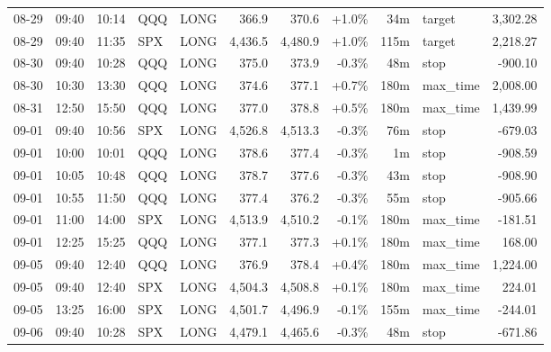 \documentclass[11pt,a4paper,twoside]{article}
\begin{document}
\begin{center}
\begin{longtable}{>{\color{txtmain}}l l l l l r r r r >{\color{txtmain}}l r}
08-29 & 09:40 & 10:14 & QQQ & LONG & 366.9 & 370.6 & \textcolor{wingreen}{+1.0\%} & 34m & target & \textcolor{wingreen}{3,302.28} \\
08-29 & 09:40 & 11:35 & SPX & LONG & 4,436.5 & 4,480.9 & \textcolor{wingreen}{+1.0\%} & 115m & target & \textcolor{wingreen}{2,218.27} \\
08-30 & 09:40 & 10:28 & QQQ & LONG & 375.0 & 373.9 & \textcolor{lossred}{-0.3\%} & 48m & stop & \textcolor{lossred}{-900.10} \\
08-30 & 10:30 & 13:30 & QQQ & LONG & 374.6 & 377.1 & \textcolor{wingreen}{+0.7\%} & 180m & max\_time & \textcolor{wingreen}{2,008.00} \\
08-31 & 12:50 & 15:50 & QQQ & LONG & 377.0 & 378.8 & \textcolor{wingreen}{+0.5\%} & 180m & max\_time & \textcolor{wingreen}{1,439.99} \\
09-01 & 09:40 & 10:56 & SPX & LONG & 4,526.8 & 4,513.3 & \textcolor{lossred}{-0.3\%} & 76m & stop & \textcolor{lossred}{-679.03} \\
09-01 & 10:00 & 10:01 & QQQ & LONG & 378.6 & 377.4 & \textcolor{lossred}{-0.3\%} & 1m & stop & \textcolor{lossred}{-908.59} \\
09-01 & 10:05 & 10:48 & QQQ & LONG & 378.7 & 377.6 & \textcolor{lossred}{-0.3\%} & 43m & stop & \textcolor{lossred}{-908.90} \\
09-01 & 10:55 & 11:50 & QQQ & LONG & 377.4 & 376.2 & \textcolor{lossred}{-0.3\%} & 55m & stop & \textcolor{lossred}{-905.66} \\
09-01 & 11:00 & 14:00 & SPX & LONG & 4,513.9 & 4,510.2 & \textcolor{lossred}{-0.1\%} & 180m & max\_time & \textcolor{lossred}{-181.51} \\
09-01 & 12:25 & 15:25 & QQQ & LONG & 377.1 & 377.3 & \textcolor{wingreen}{+0.1\%} & 180m & max\_time & \textcolor{wingreen}{168.00} \\
09-05 & 09:40 & 12:40 & QQQ & LONG & 376.9 & 378.4 & \textcolor{wingreen}{+0.4\%} & 180m & max\_time & \textcolor{wingreen}{1,224.00} \\
09-05 & 09:40 & 12:40 & SPX & LONG & 4,504.3 & 4,508.8 & \textcolor{wingreen}{+0.1\%} & 180m & max\_time & \textcolor{wingreen}{224.01} \\
09-05 & 13:25 & 16:00 & SPX & LONG & 4,501.7 & 4,496.9 & \textcolor{lossred}{-0.1\%} & 155m & max\_time & \textcolor{lossred}{-244.01} \\
09-06 & 09:40 & 10:28 & SPX & LONG & 4,479.1 & 4,465.6 & \textcolor{lossred}{-0.3\%} & 48m & stop & \textcolor{lossred}{-671.86} \\

\end{longtable}
\end{center}
\end{document}
